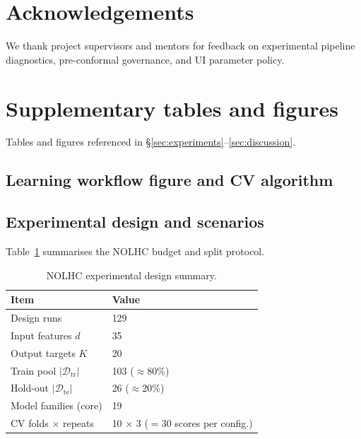 \documentclass[12pt,twocolumn,a4paper]{article}
\theoremstyle{plain}
\theoremstyle{definition}
\theoremstyle{remark}
\newcommand{\train}{\mathcal{D}_{\mathrm{tr}}}
\newcommand{\test}{\mathcal{D}_{\mathrm{te}}}
\begin{document}
\section*{Acknowledgements}
We thank project supervisors and mentors for feedback on experimental pipeline diagnostics, pre-conformal governance, and UI parameter policy.

\FloatBarrier
\clearpage
\raggedbottom



\appendix

\section{Supplementary tables and figures}
\label{app:supp}

Tables and figures referenced in \S\ref{sec:experiments}--\ref{sec:discussion}.

\subsection{Learning workflow figure and CV algorithm}
\label{app:workflow}



\subsection{Experimental design and scenarios}

Table~\ref{tab:data} summarises the NOLHC budget and split protocol.

\begin{table}[h]
  \centering
  \caption{NOLHC experimental design summary.}
  \label{tab:data}
  \small
  \begin{tabular}{@{}ll@{}}
    \toprule
    Item & Value \\
    \midrule
    Design runs & 129 \\
    Input features $d$ & 35 \\
    Output targets $K$ & 20 \\
    Train pool $|\train|$ & 103 ($\approx$80\%) \\
    Hold-out $|\test|$ & 26 ($\approx$20\%) \\
    Model families (core) & 19 \\
    CV folds $\times$ repeats & 10 $\times$ 3 ($=30$ scores per config.) \\
    \bottomrule
  \end{tabular}
\end{table}
\end{document}
